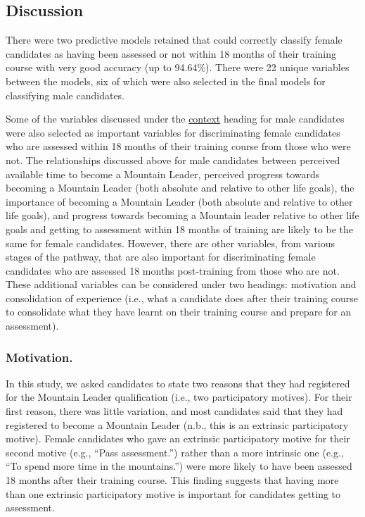 \documentclass[
  12pt,
  a4paper,
]{book}
\begin{document}
\hypertarget{pra-demale-gta-discussion}{%
\subsection{Discussion}\label{pra-demale-gta-discussion}}

There were two predictive models retained that could correctly classify female candidates as having been assessed or not within 18 months of their training course with very good accuracy (up to 94.64\%). There were 22 unique variables between the models, six of which were also selected in the final models for classifying male candidates.

Some of the variables discussed under the \protect\hyperlink{context}{context} heading for male candidates were also selected as important variables for discriminating female candidates who are assessed within 18 months of their training course from those who were not. The relationships discussed above for male candidates between perceived available time to become a Mountain Leader, perceived progress towards becoming a Mountain Leader (both absolute and relative to other life goals), the importance of becoming a Mountain Leader (both absolute and relative to other life goals), and progress towards becoming a Mountain leader relative to other life goals and getting to assessment within 18 months of training are likely to be the same for female candidates. However, there are other variables, from various stages of the pathway, that are also important for discriminating female candidates who are assessed 18 months post-training from those who are not. These additional variables can be considered under two headings: motivation and consolidation of experience (i.e., what a candidate does after their training course to consolidate what they have learnt on their training course and prepare for an assessment).

\hypertarget{pra-female-discussion-motivation}{%
\subsubsection{Motivation.}\label{pra-female-discussion-motivation}}

In this study, we asked candidates to state two reasons that they had registered for the Mountain Leader qualification (i.e., two participatory motives). For their first reason, there was little variation, and most candidates said that they had registered to become a Mountain Leader (n.b., this is an extrinsic participatory motive). Female candidates who gave an extrinsic participatory motive for their second motive (e.g., ``Pass assessment.'') rather than a more intrinsic one (e.g., ``To spend more time in the mountains.'') were more likely to have been assessed 18 months after their training course. This finding suggests that having more than one extrinsic participatory motive is important for candidates getting to assessment.
\end{document}
